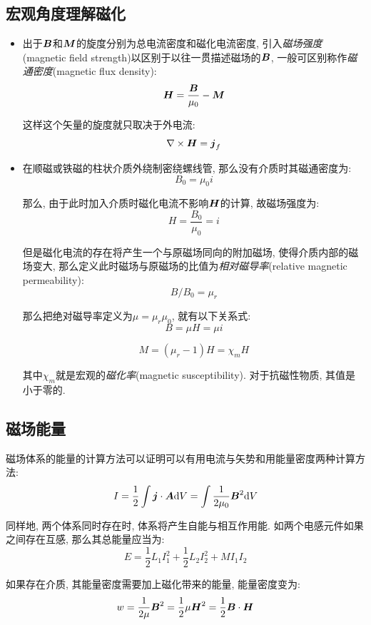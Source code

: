 \subsection{宏观角度理解磁化}

\begin{itemize}
\item 出于$\boldsymbol{B}$和$\boldsymbol{M}$的旋度分别为总电流密度和磁化电流密度, 引入\emph{磁场强度}(magnetic field strength)以区别于以往一贯描述磁场的$\boldsymbol{B}$, 一般可区别称作\emph{磁通密度}(magnetic flux density):
\[\boldsymbol{H}=\frac{\boldsymbol{B}}{\mu_0}-\boldsymbol{M}\]

这样这个矢量的旋度就只取决于外电流:
\[\nabla\times \boldsymbol{H}=\boldsymbol{j}_f\]

\item 在顺磁或铁磁的柱状介质外绕制密绕螺线管, 那么没有介质时其磁通密度为:
\[B_0=\mu_0 i\]

那么, 由于此时加入介质时磁化电流不影响$\boldsymbol{H}$的计算, 故磁场强度为:
\[H=\frac{B_0}{\mu_0}=i\]

但是磁化电流的存在将产生一个与原磁场同向的附加磁场, 使得介质内部的磁场变大, 那么定义此时磁场与原磁场的比值为\emph{相对磁导率}(relative magnetic permeability):
\[B/B_0=\mu_r\]

那么把绝对磁导率定义为$\mu=\mu_r\mu_0$, 就有以下关系式:
\[B=\mu H=\mu i\]

\[M=(\mu_r-1)H=\chi_m H\]

其中$\chi_m$就是宏观的\emph{磁化率}(magnetic susceptibility). 对于抗磁性物质, 其值是小于零的.


\end{itemize}

\subsection{磁场能量}

磁场体系的能量的计算方法可以证明可以有用电流与矢势和用能量密度两种计算方法:
\[I=\frac{1}{2}\int \boldsymbol{j}\cdot\boldsymbol{A}\textrm{d} V=\int \frac{1}{2\mu_0}	\boldsymbol{B}^2\textrm{d} V\]

同样地, 两个体系同时存在时, 体系将产生自能与相互作用能. 如两个电感元件如果之间存在互感, 那么其总能量应当为:
\[E=\frac{1}{2}L_1I_1^2+\frac{1}{2}L_2I_2^2+ MI_1I_2\]

如果存在介质, 其能量密度需要加上磁化带来的能量, 能量密度变为:
\[w=\frac{1}{2\mu}	\boldsymbol{B}^2=\frac{1}{2}\mu \boldsymbol{H}^2 =\frac{1}{2}	\boldsymbol{B}\cdot \boldsymbol{H}\]

